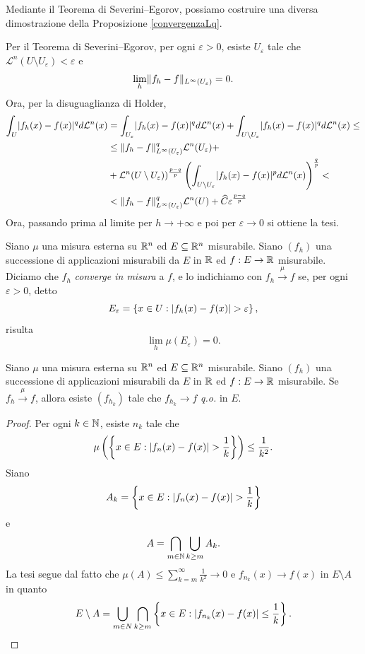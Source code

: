 \begin{osservazione}
Mediante il Teorema di Severini--Egorov, possiamo costruire una diversa dimostrazione della Proposizione \eqref{convergenzaLq}. 

Per il Teorema di Severini--Egorov, per ogni $\varepsilon > 0$, esiste $U_{\varepsilon}$ tale che $\mathcal{L}^n(U\setminus U_{\varepsilon})<\varepsilon$ e 
\[ \lim_{h}\lVert f_{h}-f\rVert_{L^{\infty}(U_{\varepsilon})} =0. \]
Ora, per la disuguaglianza di Holder,
\[\begin{split}
	 \int_{U}\lvert f_h(x)-f(x)\rvert^qd\mathcal{L}^n(x) &=   \int_{U_{\varepsilon}}\lvert f_h(x)-f(x)\rvert^qd\mathcal{L}^n(x) + \int_{U \setminus U_{\varepsilon}}\lvert f_h(x)-f(x)\rvert^qd\mathcal{L}^n(x) \le \\
	 &\le \lVert f_h-f\rVert_{L^\infty(U_{\varepsilon})}^q\mathcal{L}^n(U_{\varepsilon}) + \\
	 & + \mathcal{L}^n(U\setminus U_{\varepsilon}))^{\frac{p-q}{p}}\left( \int_{U \setminus U_{\varepsilon}} \lvert f_h(x)-f(x)\rvert^pd\mathcal{L}^n(x)\right) ^{\frac{q}{p}} < \\
	 & < \lVert f_h-f\rVert_{L^\infty(U_{\varepsilon})}^q\mathcal{L}^n(U) + \widehat{C}\varepsilon^{\frac{p-q}{p}}
\end{split} \]
Ora, passando prima al limite per $h \to +\infty$ e poi per $\varepsilon \to 0$ si ottiene la tesi.
\end{osservazione}

\begin{definizione}
	Siano $\mu$ una misura esterna su $\mathbb{R}^n$ ed $E \subseteq \mathbb{R}^n$ misurabile. Siano $(f_{h})$ una successione di applicazioni misurabili da $E$ in $\mathbb{R}$ ed $f: E \to \mathbb{R}$ misurabile. Diciamo che $f_h$ \emph{converge in misura} a $f$, e lo indichiamo con $f_h \overset{\mu}{\to} f$\index[simboli]{$\overset{\mu}{\to}$} se, per ogni $\varepsilon > 0 $, detto 
\[ E_{\varepsilon} = \left\lbrace  x \in U: \lvert f_h(x) - f(x)\rvert > \varepsilon\right\rbrace, \]
risulta
\[ \lim_{h} \mu(E_{\varepsilon}) = 0. \]
\end{definizione}
\begin{proposizione}
	Siano $\mu$ una misura esterna su $\mathbb{R}^n$ ed $E \subseteq \mathbb{R}^n$ misurabile. Siano $(f_{h})$ una successione di applicazioni misurabili da $E$ in $\mathbb{R}$ ed $f: E \to \mathbb{R}$ misurabile. Se $f_h \overset{\mu}{\to} f$, allora esiste $(f_{h_k})$ tale che $f_{h_k}\to f$ \emph{q.o.} in $E$.
\end{proposizione}
\begin{proof}
Per ogni $k \in \mathbb{N}$, esiste $n_k$ tale che 
\[ \mu\left( \left\lbrace x \in E: \lvert f_n(x)-f(x)\rvert>\frac{1}{k}\right\rbrace \right) \le \frac{1}{k^2}. \]
Siano
\[ A_k = \left\lbrace x \in E: \lvert f_n(x)-f(x)\rvert>\frac{1}{k}\right\rbrace   \]
e 
\[ A = \bigcap_{m \in \mathbb{N}} \bigcup_{k \ge m} A_k. \]
La tesi segue dal fatto che $\mu(A) \le \displaystyle \sum_{k=m}^{\infty} \frac{1}{k^2} \to 0$ e $f_{n_k}(x) \to f(x)$ in  $E\setminus A$ in quanto 
\[ E \setminus A = \bigcup_{m \in N} \bigcap_{k \ge m} \left\lbrace x \in E: \lvert f_{n_k}(x)-f(x)\rvert \le \frac{1}{k} \right\rbrace. \qedhere\]
\end{proof}

